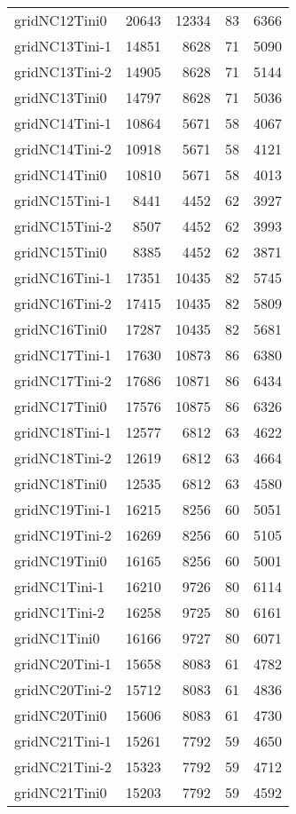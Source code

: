 \begin{longtable}{lrrrr}
gridNC12Tini0 & 20643 & 12334 & 83 & 6366 \\
gridNC13Tini-1 & 14851 & 8628 & 71 & 5090 \\
gridNC13Tini-2 & 14905 & 8628 & 71 & 5144 \\
gridNC13Tini0 & 14797 & 8628 & 71 & 5036 \\
gridNC14Tini-1 & 10864 & 5671 & 58 & 4067 \\
gridNC14Tini-2 & 10918 & 5671 & 58 & 4121 \\
gridNC14Tini0 & 10810 & 5671 & 58 & 4013 \\
gridNC15Tini-1 & 8441 & 4452 & 62 & 3927 \\
gridNC15Tini-2 & 8507 & 4452 & 62 & 3993 \\
gridNC15Tini0 & 8385 & 4452 & 62 & 3871 \\
gridNC16Tini-1 & 17351 & 10435 & 82 & 5745 \\
gridNC16Tini-2 & 17415 & 10435 & 82 & 5809 \\
gridNC16Tini0 & 17287 & 10435 & 82 & 5681 \\
gridNC17Tini-1 & 17630 & 10873 & 86 & 6380 \\
gridNC17Tini-2 & 17686 & 10871 & 86 & 6434 \\
gridNC17Tini0 & 17576 & 10875 & 86 & 6326 \\
gridNC18Tini-1 & 12577 & 6812 & 63 & 4622 \\
gridNC18Tini-2 & 12619 & 6812 & 63 & 4664 \\
gridNC18Tini0 & 12535 & 6812 & 63 & 4580 \\
gridNC19Tini-1 & 16215 & 8256 & 60 & 5051 \\
gridNC19Tini-2 & 16269 & 8256 & 60 & 5105 \\
gridNC19Tini0 & 16165 & 8256 & 60 & 5001 \\
gridNC1Tini-1 & 16210 & 9726 & 80 & 6114 \\
gridNC1Tini-2 & 16258 & 9725 & 80 & 6161 \\
gridNC1Tini0 & 16166 & 9727 & 80 & 6071 \\
gridNC20Tini-1 & 15658 & 8083 & 61 & 4782 \\
gridNC20Tini-2 & 15712 & 8083 & 61 & 4836 \\
gridNC20Tini0 & 15606 & 8083 & 61 & 4730 \\
gridNC21Tini-1 & 15261 & 7792 & 59 & 4650 \\
gridNC21Tini-2 & 15323 & 7792 & 59 & 4712 \\
gridNC21Tini0 & 15203 & 7792 & 59 & 4592 \\

\end{longtable}
